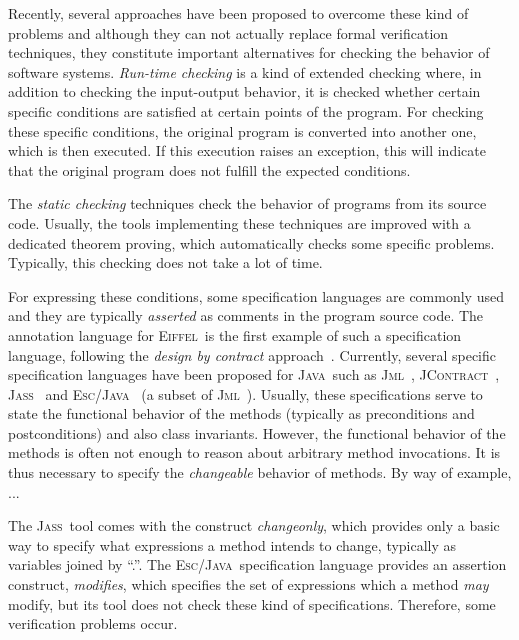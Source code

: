 \documentclass[a4paper]{llncs}
\newcommand{\jml}{\textsc{Jml}}
\newcommand{\escj}{\textsc{Esc/Java}}
\newcommand{\jass}{\textsc{Jass}}
\newcommand{\jcontract}{\textsc{JContract}}
\newcommand{\java}{\textsc{Java}}
\newcommand{\eiff}{\textsc{Eiffel}}
\newcommand{\modifies}{\textit{modifies}}
\begin{document}
Recently, several approaches have been
proposed to overcome these kind of problems and although they can not
actually replace formal verification techniques, they constitute
important alternatives for checking the behavior of software
systems. \emph{Run-time
checking} is a kind of extended checking where, in addition to checking
the input-output behavior, it is checked whether certain specific
conditions are
satisfied at certain points of the program. For checking these
specific conditions, the original program is converted into another
one,
which is then executed. If this execution raises an exception,
this will indicate that the original program does not fulfill the
expected conditions.

The \emph{static checking} techniques check the behavior of programs
from its source code. Usually, the tools implementing these
techniques are improved with a dedicated theorem proving, which
automatically checks some specific problems. Typically, this checking
does not take a lot of time.

For expressing these conditions, some specification languages are
commonly used and they are typically \emph{asserted} as comments in
the
program source code. The annotation language for \eiff~is the first
example of such a specification language, following the \emph{design
by contract} approach~\cite{Mey97}. Currently, several specific
specification languages have been proposed for \java~such as
\jml~\cite{LBR00}, \jcontract~\cite{JContractUrl},
\jass~\cite{JassUrl} and \escj~\cite{LeinoNS00} (a subset of
\jml~\cite{EscJmlDiff}). Usually, these specifications serve to state
the functional behavior of the methods (typically as preconditions and
postconditions) and also class invariants. However, the
functional behavior of the methods is often not enough to reason about
arbitrary method invocations. It is thus necessary to specify the
\emph{changeable} behavior of methods. By way of example, ...

The \jass~tool comes with the construct \textit{changeonly}, which
provides only a basic way to specify what expressions a method intends
to change, typically as variables joined by ``.''. The
\escj~specification
language provides an assertion construct,
\modifies, which specifies the set of expressions which a method
\emph{may} modify, but its tool does not check these kind of
specifications. Therefore, some verification problems occur.
\end{document}
